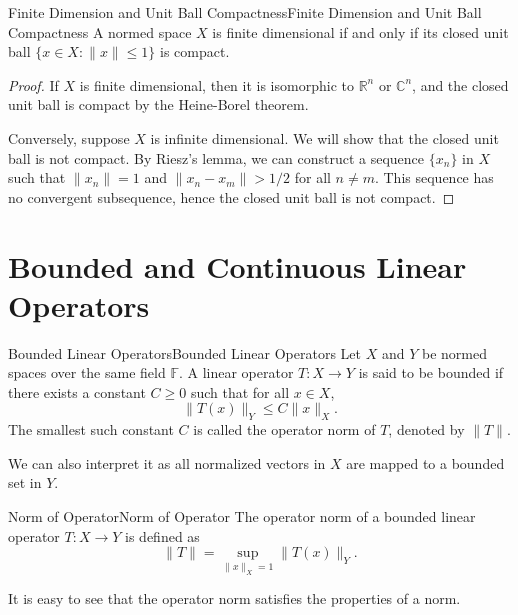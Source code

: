 \documentclass[../main.tex]{subfiles}
\begin{document}
\begin{theorem}{Finite Dimension and Unit Ball Compactness}{Finite Dimension and Unit Ball Compactness}
	A normed space $X$ is finite dimensional if and only if its closed unit ball $\{x \in X : \|x\| \leq 1\}$ is compact.
\end{theorem}
\begin{proof}
	If $X$ is finite dimensional, then it is isomorphic to $\mathbb{R}^n$ or $\mathbb{C}^n$, and the closed unit ball is compact by the Heine-Borel theorem.

	Conversely, suppose $X$ is infinite dimensional. We will show that the closed unit ball is not compact. By Riesz's lemma, we can construct a sequence $\{x_n\}$ in $X$ such that $\|x_n\| = 1$ and $\|x_n - x_m\| > 1/2$ for all $n \neq m$. This sequence has no convergent subsequence, hence the closed unit ball is not compact.
\end{proof}

\section{Bounded and Continuous Linear Operators}
\begin{definition}{Bounded Linear Operators}{Bounded Linear Operators}
	Let $X$ and $Y$ be normed spaces over the same field $\mathbb{F}$. A linear operator $T: X \rightarrow Y$ is said to be bounded if there exists a constant $C \geq 0$ such that for all $x \in X$,
	\begin{equation*}
		\|T(x)\|_Y \leq C \|x\|_X.
	\end{equation*}
	The smallest such constant $C$ is called the operator norm of $T$, denoted by $\|T\|$.
\end{definition}

We can also interpret it as all normalized vectors in $X$ are mapped to a bounded set in $Y$.

\begin{definition}{Norm of Operator}{Norm of Operator}
	The operator norm of a bounded linear operator $T: X \rightarrow Y$ is defined as
	\begin{equation*}
		\|T\| = \sup_{\|x\|_X = 1} \|T(x)\|_Y.
	\end{equation*}
\end{definition}
It is easy to see that the operator norm satisfies the properties of a norm.
\end{document}
